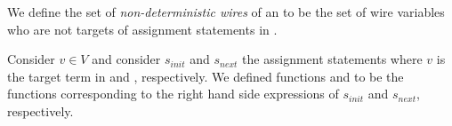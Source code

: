 \begin{definition}
We define the set of {\em non-deterministic wires} of 
an \caig to be the set of wire variables who are not 
targets of assignment statements in .
\end{definition}



\begin{definition}
Consider $v\in V$ and consider $s_{init}$ and $s_{next}$ 
the assignment statements where $v$ is the target term in 
 and , respectively. 
We defined 
functions  and 
to be the functions corresponding to the right hand side 
expressions of $s_{init}$ and $s_{next}$, respectively. 
\end{definition}

